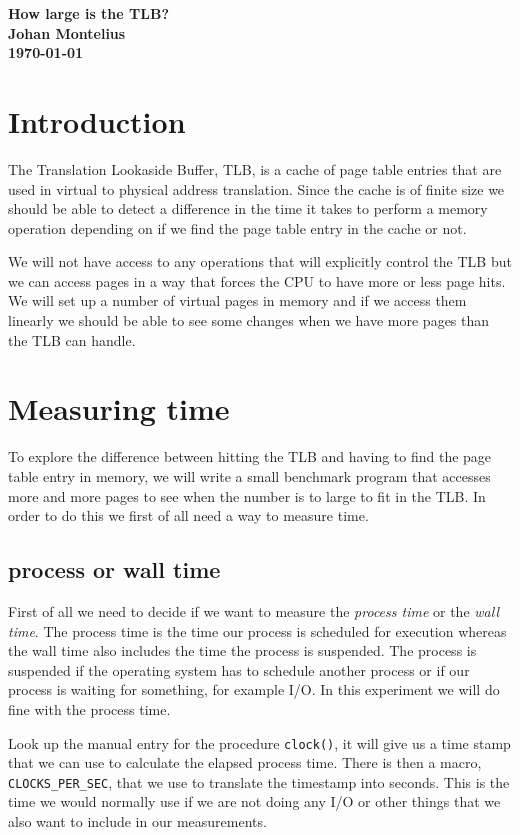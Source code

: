 \documentclass[a4paper,11pt]{article}
\newcommand{\nnsection}[1]{
\section*{#1} \addcontentsline{toc}{section}{#1} }
\begin{document}
\begin{center} \vspace{20pt} \textbf{\large How large is the TLB?}\\
\vspace{10pt} \textbf{Johan Montelius}\\ \vspace{10pt} \textbf{\today}
\end{center}

\nnsection{Introduction}

The Translation Lookaside Buffer, TLB, is a cache of page table
entries that are used in virtual to physical address
translation. Since the cache is of finite size we should be able to
detect a difference in the time it takes to perform a memory operation
depending on if we find the page table entry in the cache or not.

We will not have access to any operations that will explicitly control
the TLB but we can access pages in a way that forces the CPU to have
more or less page hits. We will set up a number of virtual pages in
memory and if we access them linearly we should be able to see some
changes when we have more pages than the TLB can handle. 

\section{Measuring time}

To explore the difference between hitting the TLB and having to find
the page table entry in memory, we will write a small benchmark program that
accesses more and more pages to see when the number is to
large to fit in the TLB. In order to do this we first of all need a
way to measure time.

\subsection{process or wall time}

First of all we need to decide if we want to measure the {\em process
  time} or the {\em wall time}. The process time is the time our
process is scheduled for execution whereas the wall time also includes
the time the process is suspended. The process is suspended if the
operating system has to schedule another process or if our process is
waiting for something, for example I/O. In this experiment we will do
fine with the process time.

Look up the manual entry for the procedure {\tt clock()}, it will give
us a time stamp that we can use to calculate the elapsed process
time. There is then a macro, {\tt CLOCKS\_PER\_SEC}, that we use to
translate the timestamp into seconds. This is the time we would
normally use if we are not doing any I/O or other things that we also
want to include in our measurements.
\end{document}
